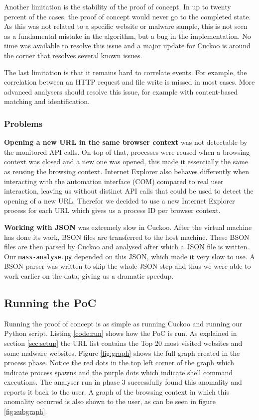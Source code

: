 Another limitation is the stability of the proof of concept. In up to twenty percent of the cases, the proof of concept would never go to the completed state. As this was not related to a specific website or malware sample, this is not seen as a fundamental mistake in the algorithm, but a bug in the implementation. No time was available to resolve this issue and a major update for Cuckoo is around the corner that resolves several known issues.

The last limitation is that it remains hard to correlate events. For example, the correlation between an HTTP request and file write is missed in most cases. More advanced analysers should resolve this issue, for example with content-based matching and identification.

\subsubsection{Problems}
\label{99problems}

\textbf{Opening a new URL in the same browser context} was not detectable by the monitored API calls. On top of that, processes were reused when a browsing context was closed and a new one was opened, this made it essentially the same as reusing the browsing context. Internet Explorer also behaves differently when interacting with the automation interface (COM) compared to real user interaction, leaving us without distinct API calls that could be used to detect the opening of a new URL. Therefor we decided to use a new Internet Explorer process for each URL which gives us a process ID per browser context.

\textbf{Working with JSON} was extremely slow in Cuckoo. After the virtual machine has done its work, BSON files are transferred to the host machine. These BSON files are then parsed by Cuckoo and analysed after which a JSON file is written. Our \texttt{mass-analyse.py} depended on this JSON, which made it very slow to use. A BSON parser was written to skip the whole JSON step and thus we were able to work earlier on the data, giving us a dramatic speedup.

\subsection{Running the PoC}

Running the proof of concept is as simple as running Cuckoo and running our Python script. Listing \ref{code:run} shows how the PoC is run. As explained in section \ref{sec:setup} the URL list contains the Top 20 most visited websites and some malware websites. Figure \ref{fig:graph} shows the full graph created in the process phase. Notice the red dots in the top left corner of the graph which indicate process spawns and the purple dots which indicate shell command executions. The analyser run in phase 3 successfully found this anomality and reports it back to the user. A graph of the browsing context in which this anomality occurred is also shown to the user, as can be seen in figure \ref{fig:subgraph}.

